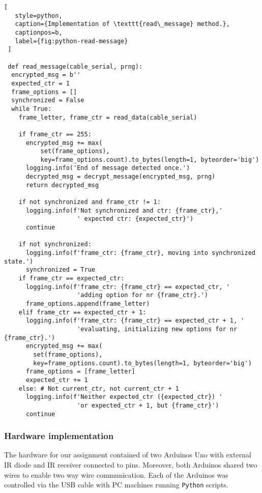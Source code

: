  \begin{minipage}{\linewidth}
  \begin{lstlisting}[
   style=python,
   caption={Implementation of \texttt{read\_message} method.},
   captionpos=b,
   label={fig:python-read-message}
 ]

 def read_message(cable_serial, prng):
  encrypted_msg = b''
  expected_ctr = 1
  frame_options = []
  synchronized = False
  while True:
    frame_letter, frame_ctr = read_data(cable_serial)

    if frame_ctr == 255:
      encrypted_msg += max(
          set(frame_options),
          key=frame_options.count).to_bytes(length=1, byteorder='big')
      logging.info('End of message detected once.')
      decrypted_msg = decrypt_message(encrypted_msg, prng)
      return decrypted_msg

    if not synchronized and frame_ctr != 1:
      logging.info(f'Not synchronized and ctr: {frame_ctr},'
                    ' expected ctr: {expected_ctr}')
      continue

    if not synchronized:
      logging.info(f'frame_ctr: {frame_ctr}, moving into synchronized state.')
      synchronized = True
    if frame_ctr == expected_ctr:
      logging.info(f'frame_ctr: {frame_ctr} == expected_ctr, '
                    'adding option for nr {frame_ctr}.')
      frame_options.append(frame_letter)
    elif frame_ctr == expected_ctr + 1:
      logging.info(f'frame_ctr: {frame_ctr} == expected_ctr + 1, '
                    'evaluating, initializing new options for nr {frame_ctr}.')
      encrypted_msg += max(
        set(frame_options),
        key=frame_options.count).to_bytes(length=1, byteorder='big')
      frame_options = [frame_letter]
      expected_ctr += 1
    else: # Not current_ctr, not current_ctr + 1
      logging.info(f'Neither expected_ctr ({expected_ctr}) '
                    'or expected_ctr + 1, but {frame_ctr}')
      continue
 \end{lstlisting}
 \end{minipage}


 \subsubsection{Hardware implementation}
The hardware for our assignment contained of two Arduinos Uno with external IR diode and IR receiver connected to pins. Moreover, both Arduinos shared two wires to enable two way wire communication. Each of the Arduinos was controlled via the USB cable with PC machines running \texttt{Python} scripts.

